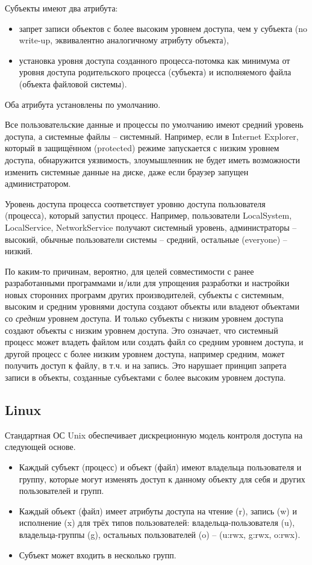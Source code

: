 Субъекты имеют два атрибута:
\begin{itemize}
    \item запрет записи объектов с более высоким уровнем доступа, чем у субъекта (no write-up, эквивалентно аналогичному атрибуту объекта),
    \item установка уровня доступа созданного процесса-потомка как минимума от уровня доступа родительского процесса (субъекта) и исполняемого файла (объекта файловой системы).
\end{itemize}
Оба атрибута установлены по умолчанию.

Все пользовательские данные и процессы по умолчанию имеют средний уровень доступа, а системные файлы -- системный. Например, если в Internet Explorer, который в защищённом (protected) режиме запускается с низким уровнем доступа, обнаружится уязвимость, злоумышленник не будет иметь возможности изменить системные данные на диске, даже если браузер запущен администратором.

Уровень доступа процесса соответствует уровню доступа пользователя (процесса), который запустил процесс. Например, пользователи LocalSystem, LocalService, NetworkService получают системный уровень, администраторы -- высокий, обычные пользователи системы -- средний, остальные (everyone) -- низкий.

По каким-то причинам, вероятно, для целей совместимости с ранее разработанными программами и/или для упрощения разработки и настройки новых сторонних программ других производителей, субъекты с системным, высоким и средним уровнями доступа создают объекты или владеют объектами со \emph{средним} уровнем доступа. И только субъекты с низким уровнем доступа создают объекты с низким уровнем доступа. Это означает, что системный процесс может владеть файлом или создать файл со средним уровнем доступа, и другой процесс с более низким уровнем доступа, например средним, может получить доступ к файлу, в т.ч. и на запись. Это нарушает принцип запрета записи в объекты, созданные субъектами с более высоким уровнем доступа.


\subsection{Linux}

Стандартная ОС Unix обеспечивает дискреционную модель контроля доступа на следующей основе.
\begin{itemize}
    \item Каждый субъект (процесс) и объект (файл) имеют владельца пользователя и группу, которые могут изменять доступ к данному объекту для себя и других пользователей и групп.
    \item Каждый объект (файл) имеет атрибуты доступа на чтение (r), запись (w) и исполнение (x) для трёх типов пользователей: владельца-пользователя (u), владельца-группы (g), остальных пользователей (o) -- (u:rwx, g:rwx, o:rwx).
    \item Субъект может входить в несколько групп.
\end{itemize}

